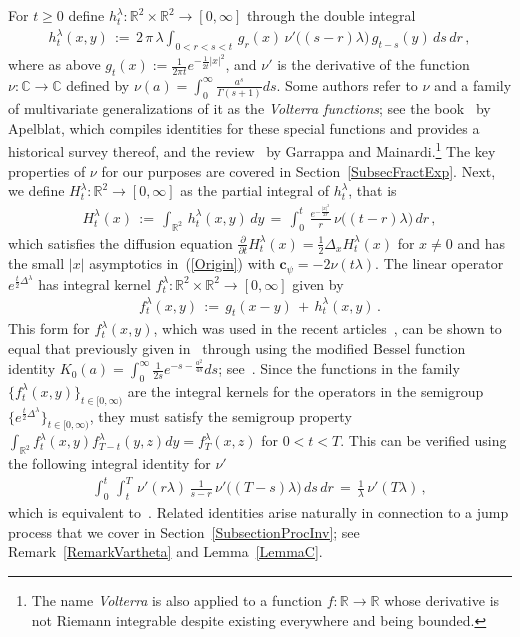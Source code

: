 \documentclass[10pt]{article}
\numberwithin{equation}{section}
\theoremstyle{definition}
\newcommand{\R}{{\mathbb R}}
\newcommand{\C}{{\mathbb C}}
\begin{document}
 For $t\geq 0$ define $h_{t}^{\lambda}:\R^2\times \R^2\rightarrow [0,\infty]$ through the double integral
\begin{align}\label{DefLittleH}
      h_{t}^{\lambda}(x, y)\,:=\, 2\,\pi\, \lambda \int_{0 < r < s < t}\,g_{r}( x)\,\nu'\big((s-r)\lambda\big)\,g_{t-s}(y)\,ds\,dr\,,
\end{align}
where as above $g_t(x):=\frac{ 1  }{ 2\pi t } e^{-\frac{1}{2t}|x|^2}$,  and $\nu'$ is the derivative of the function $\nu:\C\rightarrow \C$ defined by  $\nu(a)=\int_0^{\infty}\frac{ a^{s} }{\Gamma(s+1) }ds  $. Some authors  refer to  $\nu$ and a family of multivariate generalizations of it as the \textit{Volterra functions}; see the book~\cite{Apelblat0} by Apelblat, which compiles identities for these special functions and provides a historical survey thereof, and the  review~\cite{Garrappa} by Garrappa and Mainardi.\footnote{The name \textit{Volterra} is also applied to a function $f:\R\rightarrow \R$ whose derivative is not Riemann integrable despite existing everywhere and being bounded.}  The key properties of $\nu$ for our purposes are covered in  Section~\ref{SubsecFractExp}.  Next, we  define $H_{t}^{\lambda}:\R^2\rightarrow [0,\infty]$ as the partial integral of $h_{t}^{\lambda}$, that is
\begin{align}\label{DefH}
H_t^{\lambda}(x)\,:=\, \int_{\R^2}\,h_{t}^{\lambda}(x, y)\, dy\,=\,   \int_{0 }^t \,\frac{e^{-\frac{|x|^2}{2r}} }{r }\,\nu\big((t-r)\lambda\big)\,dr\,,
\end{align}
which satisfies the diffusion equation $    \frac{\partial}{\partial t} H_{ t}^{\lambda}(x)=\frac{1}{2}\Delta_x H_{ t}^{\lambda}(x) $
for $x\neq 0$ and has the small $|x|$ asymptotics in~(\ref{Origin}) with $\mathbf{c}_{\psi}=-2\nu(t\lambda) $.  The linear operator $e^{ \frac{t}{2}\Delta^{\lambda}  } $ has integral kernel $f_{t}^{\lambda}:\R^2\times \R^2\rightarrow [0,\infty]$ given by
\begin{align}\label{DefFullKer}
 f_{t}^{ \lambda}(x,y)\,:=\, g_{t}(x-y) \,+\,h_{t}^{ \lambda}(x,y) \,.
\end{align}
This form for $f^{\lambda}_t(x,y)$, which was used in the recent articles~\cite{GQT,Chen,CSZ5},  can  be shown to   equal that  previously given  in~\cite[Eqn.\ (3.11)]{Albeverio} through using the modified Bessel function identity $K_0(a)=\int_0^{\infty} \frac{1}{2s}e^{-s-\frac{a^2}{4s}  }ds    $; see~\cite[Rrk.\ 2.1]{GQT}.  Since the  functions in the family $\{ f_t^{\lambda}(x,y) \}_{t\in [0,\infty)}$ are the integral kernels  for the operators in the semigroup $\{e^{\frac{t}{2}\Delta^{\lambda}}\}_{t\in [0,\infty)}$, they must satisfy the semigroup property $\int_{\R^2}f_t^{\lambda}(x,y)f_{T-t}^{\lambda}(y,z)dy=f_{T}^{\lambda}(x,z) $ for $0<t<T$. This can be verified  using the following integral identity for $\nu'$
\begin{align}\label{DoubleNuPrime}
\int_{0}^t \,\int_{t}^T  \,\nu'(r\lambda)\,\frac{1}{s-r}\,\nu'\big( (T-s)\lambda\big) \,ds\,dr\,=\,\frac{1}{\lambda} \,\nu'(T\lambda)\,, 
\end{align}
which is equivalent to~\cite[Lem.\ 8.7]{GQT}.  Related identities arise naturally in connection to a jump process that we cover in Section~\ref{SubsectionProcInv}; see Remark~\ref{RemarkVartheta} and Lemma~\ref{LemmaC}.
\end{document}
